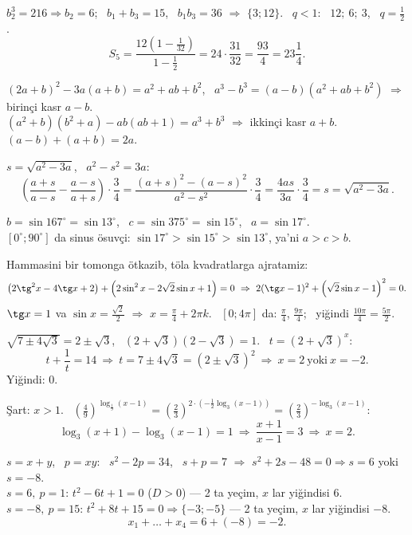 $b_2^3=216\Rightarrow b_2=6$; \ $b_1+b_3=15$, \ $b_1b_3=36$ $\Rightarrow$ $\{3;12\}$. \ $q<1$: \ $12;\ 6;\ 3$, \ $q=\frac12$.
\[S_5=\frac{12\left(1-\frac1{32}\right)}{1-\frac12}=24\cdot\frac{31}{32}=\frac{93}4=23\frac14.\]

$(2a+b)^2-3a(a+b)=a^2+ab+b^2$, \ $a^3-b^3=(a-b)(a^2+ab+b^2)$ $\Rightarrow$ birinçi kasr $a-b$.\\
$(a^2+b)(b^2+a)-ab(ab+1)=a^3+b^3$ $\Rightarrow$ ikkinçi kasr $a+b$. \quad $(a-b)+(a+b)=2a$.

$s=\sqrt{a^2-3a}$, \ $a^2-s^2=3a$:
\[\left(\frac{a+s}{a-s}-\frac{a-s}{a+s}\right)\cdot\frac34=\frac{(a+s)^2-(a-s)^2}{a^2-s^2}\cdot\frac34=\frac{4as}{3a}\cdot\frac34=s=\sqrt{a^2-3a}.\]

$b=\sin167^\circ=\sin13^\circ$, \ $c=\sin375^\circ=\sin15^\circ$, \ $a=\sin17^\circ$.\\
$[0^\circ;90^\circ]$ da sinus ösuvçi: $\sin17^\circ>\sin15^\circ>\sin13^\circ$, ya'ni $a>c>b$.

Hammasini bir tomonga ötkazib, töla kvadratlarga ajratamiz:
\[\left(2\tg^2x-4\tg x+2\right)+\left(2\sin^2x-2\sqrt2\sin x+1\right)=0\ \Rightarrow\ 2(\tg x-1)^2+\left(\sqrt2\sin x-1\right)^2=0.\]
$\tg x=1$ va $\sin x=\frac{\sqrt2}2$ $\Rightarrow$ $x=\frac\pi4+2\pi k$. \ $[0;4\pi]$ da: $\frac\pi4$, $\frac{9\pi}4$; \ yiğindi $\frac{10\pi}4=\frac{5\pi}2$.

$\sqrt{7\pm4\sqrt3}=2\pm\sqrt3$, \ $(2+\sqrt3)(2-\sqrt3)=1$. \ $t=(2+\sqrt3)^x$:
\[t+\frac1t=14\ \Rightarrow\ t=7\pm4\sqrt3=(2\pm\sqrt3)^2\ \Rightarrow\ x=2\ \text{yoki}\ x=-2.\]
Yiğindi: $0$.

Şart: $x>1$. \ $\left(\frac49\right)^{\log_{\frac19}(x-1)}=\left(\frac23\right)^{2\cdot\left(-\frac12\log_3(x-1)\right)}=\left(\frac23\right)^{-\log_3(x-1)}$:
\[\log_3(x+1)-\log_3(x-1)=1\ \Rightarrow\ \frac{x+1}{x-1}=3\ \Rightarrow\ x=2.\]

$s=x+y$, \ $p=xy$: \ $s^2-2p=34$, \ $s+p=7$ $\Rightarrow$ $s^2+2s-48=0\Rightarrow s=6$ yoki $s=-8$.\\
$s=6,\ p=1$: $t^2-6t+1=0$ ($D>0$) — 2 ta yeçim, $x$ lar yiğindisi $6$.\\
$s=-8,\ p=15$: $t^2+8t+15=0\Rightarrow\{-3;-5\}$ — 2 ta yeçim, $x$ lar yiğindisi $-8$.
\[x_1+\dots+x_4=6+(-8)=-2.\]

